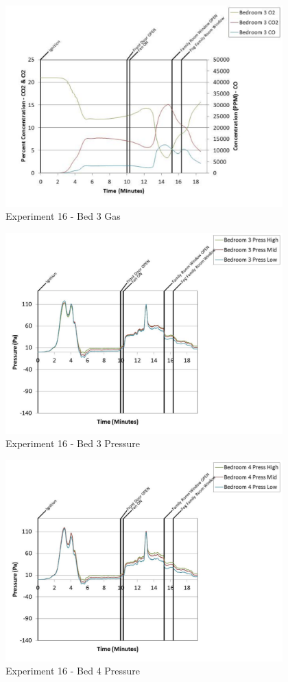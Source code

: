 \documentclass{article}
\begin{document}
\begin{appendices}
	\clearpage

	\begin{figure}[h!]
		\centering
		\includegraphics[height=3.05in]{0_Images/Results_Charts/Exp_16_Charts/Bed3Gas.pdf}
		\caption{Experiment 16 - Bed 3 Gas}
	\end{figure}
 

	\begin{figure}[h!]
		\centering
		\includegraphics[height=3.05in]{0_Images/Results_Charts/Exp_16_Charts/Bed3Pressure.pdf}
		\caption{Experiment 16 - Bed 3 Pressure}
	\end{figure}
 
	\clearpage

	\begin{figure}[h!]
		\centering
		\includegraphics[height=3.05in]{0_Images/Results_Charts/Exp_16_Charts/Bed4Pressure.pdf}
		\caption{Experiment 16 - Bed 4 Pressure}
	\end{figure}
 


\end{appendices}
\end{document}
